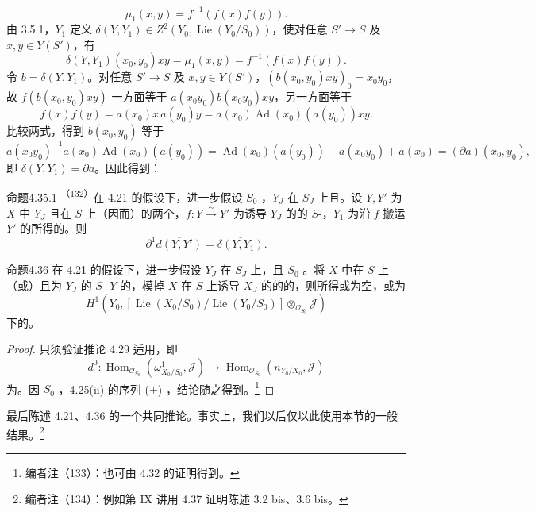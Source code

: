 \[\mu_1(x,y)=f^{-1}(f(x)f(y)).\]
由 3.5.1，$Y_1$ 定义 $\delta(Y,Y_1)\in Z^2(Y_0,\operatorname{Lie}(Y_0/S_0))$，使对任意 $S'\to S$ 及 $x,y\in Y(S')$，有
\[\delta(Y,Y_1)(x_0,y_0)xy=\mu_1(x,y)=f^{-1}(f(x)f(y)).\]
令 $b=\delta(Y,Y_1)$。对任意 $S'\to S$ 及 $x,y\in Y(S')$，$(b(x_0,y_0)xy)_0=x_0y_0$，故 $f(b(x_0,y_0)xy)$ 一方面等于 $a(x_0y_0)b(x_0y_0)xy$，另一方面等于
\[f(x)f(y)=a(x_0)x\,a(y_0)y=a(x_0)\operatorname{Ad}(x_0)(a(y_0))xy.\]
比较两式，得到 $b(x_0,y_0)$ 等于
\[a(x_0y_0)^{-1}a(x_0)\operatorname{Ad}(x_0)(a(y_0))=\operatorname{Ad}(x_0)(a(y_0))-a(x_0y_0)+a(x_0)=(\partial a)(x_0,y_0),\]
即 $\delta(Y,Y_1)=\partial a$。因此得到：
\begin{SGAresult}{命题}{4.35.1}
\textsuperscript{（132）}在 4.21 的假设下，进一步假设 $S_0$ ，$Y_J$ 在 $S_J$ 上且。设 $Y,Y'$ 为 $X$ 中 $Y_J$ 且在 $S$ 上（因而）的两个，$f:Y\xrightarrow\sim Y'$ 为诱导 $Y_J$ 的的 $S$-，$Y_1$ 为沿 $f$ 搬运 $Y'$ 的所得的。则
\[\partial^1\overline{d(Y,Y')}=\overline{\delta(Y,Y_1)}.\]
\end{SGAresult}
\begin{SGAresult}{命题}{4.36}
在 4.21 的假设下，进一步假设 $Y_J$ 在 $S_J$ 上，且 $S_0$ 。将 $X$ 中在 $S$ 上（或）且为 $Y_J$ 的 $S$- $Y$ 的，模掉 $X$ 在 $S$ 上诱导 $X_J$ 的的的，则所得或为空，或为
\[H^1(Y_0,[\operatorname{Lie}(X_0/S_0)/\operatorname{Lie}(Y_0/S_0)]\otimes_{\mathscr O_{S_0}}\mathscr J)\]
下的。
\end{SGAresult}
\begin{proof}
只须验证推论 4.29 适用，即
\[d^0:\operatorname{Hom}_{\mathscr O_{S_0}}(\omega^1_{X_0/S_0},\mathscr J)\longrightarrow\operatorname{Hom}_{\mathscr O_{S_0}}(n_{Y_0/X_0},\mathscr J)\]
为。因 $S_0$ ，4.25(ii) 的序列 ($+$) ，结论随之得到。\footnote{编者注（133）：也可由 4.32 的证明得到。}
\end{proof}
最后陈述 4.21、4.36 的一个共同推论。事实上，我们以后仅以此使用本节的一般结果。\footnote{编者注（134）：例如第 IX 讲用 4.37 证明陈述 3.2 bis、3.6 bis。}
